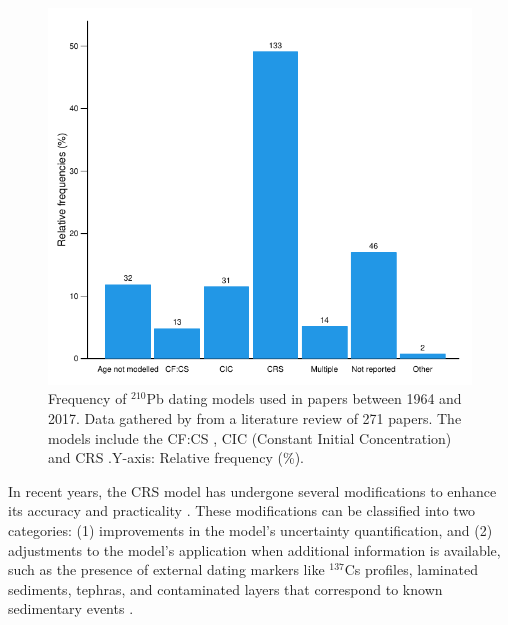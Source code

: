 \documentclass [10pt] {article}
\begin{document}
\begin{figure}[h!]
	\begin{centering}
		\includegraphics[width=.75\linewidth]{barras.pdf}
		\caption{Frequency of $^{210}$Pb dating models used in papers between 1964 and 2017. Data gathered by \citet{Courtney2019} from a literature review of 271 papers. The models include the CF:CS \citep[Constant Flux - Constant Sedimentation;][]{Robbins1978}, CIC (Constant Initial Concentration) \citep{Goldberg1963,Crozaz1964,Robbins1978} and CRS  \citep[Constant Rate of Supply;][]{Appleby1978,Robbins1978}.Y-axis: Relative frequency (\%). }
		\label{fig:210models}
	\end{centering}
\end{figure}

In recent years, the CRS model has undergone several modifications to enhance its accuracy and practicality \citep{Binford1990,Appleby2001,Sanchez-Cabeza2014}. These modifications can be classified into two categories: (1) improvements in the model's uncertainty quantification, and (2) adjustments to the model's application when additional information is available, such as the presence of external dating markers like $^{137}$Cs profiles, laminated sediments, tephras, and contaminated layers that correspond to known sedimentary events \citep{Appleby1998,Appleby2001,Appleby2008}.
\end{document}
